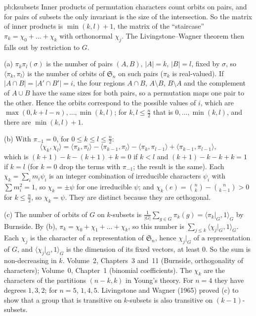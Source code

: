 \begin{solution}{pb:ksubsets}
\idea Inner products of permutation characters count orbits on pairs, and for pairs of subsets the only invariant is the size of
the intersection. So the matrix of inner products is $\min(k,l)+1$, the matrix of the ``staircase'' $\pi_k=\chi_0+\dots+\chi_k$
with orthonormal $\chi_j$. The Livingstone--Wagner theorem then falls out by restriction to $G$.

\writeup (a) $\pi_k\pi_l(\sigma)$ is the number of pairs $(A,B)$, $|A|=k$, $|B|=l$, fixed by $\sigma$, so
$\langle\pi_k,\pi_l\rangle$ is the number of orbits of $\mathfrak S_n$ on such pairs ($\pi_k$ is real-valued). If $|A\cap B|=|A'\cap B'|=i$,
the four regions $A\cap B$, $A\setminus B$, $B\setminus A$ and the complement of $A\cup B$ have the same sizes for both pairs, so a
permutation maps one pair to the other. Hence the orbits correspond to the possible values of $i$, which are
$\max(0,k+l-n),\dots,\min(k,l)$; for $k,l\le\frac n2$ that is $0,\dots,\min(k,l)$, and there are $\min(k,l)+1$.

(b) With $\pi_{-1}=0$, for $0\le k\le l\le\frac n2$:
\[
\langle\chi_k,\chi_l\rangle=\langle\pi_k,\pi_l\rangle-\langle\pi_{k-1},\pi_l\rangle-\langle\pi_k,\pi_{l-1}\rangle+\langle\pi_{k-1},\pi_{l-1}\rangle,
\]
which is $(k+1)-k-(k+1)+k=0$ if $k<l$ and $(k+1)-k-k+k=1$ if $k=l$ (for $k=0$ drop the terms with $\pi_{-1}$; the result is the
same). Each $\chi_k=\sum_im_i\psi_i$ is an integer combination of irreducible characters $\psi_i$ with $\sum m_i^2=1$, so
$\chi_k=\pm\psi$ for one irreducible $\psi$; and $\chi_k(e)=\binom nk-\binom n{k-1}>0$ for $k\le\frac n2$, so $\chi_k=\psi$. They are
distinct because they are orthogonal.

(c) The number of orbits of $G$ on $k$-subsets is $\frac1{|G|}\sum_{g\in G}\pi_k(g)=\langle\pi_k|_G,1\rangle_G$ by Burnside. By (b),
$\pi_k=\chi_0+\chi_1+\dots+\chi_k$, so this number is $\sum_{j\le k}\langle\chi_j|_G,1\rangle_G$. Each $\chi_j$ is the character of a
representation of $\mathfrak S_n$, hence $\chi_j|_G$ of a representation of $G$, and $\langle\chi_j|_G,1\rangle_G$ is the
dimension of its fixed vectors, at least $0$. So the sum is non-decreasing in $k$.
\tools Volume~2, Chapters~3 and~11 (Burnside, orthogonality of characters); Volume~0, Chapter~1 (binomial coefficients).
\leads The $\chi_k$ are the characters of the partitions $(n-k,k)$ in Young's theory. For $n=4$ they have degrees $1,3,2$; for
$n=5$, $1,4,5$. Livingstone and Wagner (1965) proved (c) to show that a group that is transitive on $k$-subsets is also transitive
on $(k-1)$-subsets.
\end{solution}

